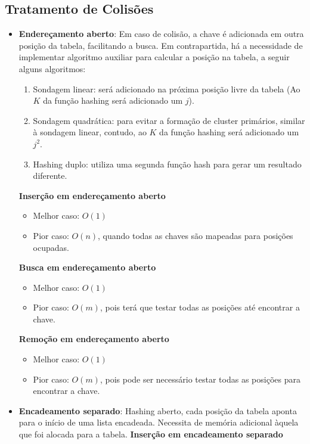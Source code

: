 \documentclass[•]{article}
\begin{document}
		\subsection{Tratamento de Colisões}
			\begin{itemize}
%			
%
				\item \textbf{Endereçamento aberto}: Em caso de colisão, a chave é adicionada em outra posição da tabela, facilitando a busca. Em contrapartida, há a necessidade de implementar algoritmo auxiliar para calcular a posição na tabela, a seguir alguns algoritmos:
				\begin{enumerate}
					\item Sondagem linear: será adicionado na próxima posição livre da tabela (Ao $K$ da função hashing será adicionado um $j$).
					\item Sondagem quadrática: para evitar a formação de cluster primários, similar à sondagem linear, contudo, ao $K$ da função hashing será adicionado um $j^2$.
					\item Hashing duplo: utiliza uma segunda função hash para gerar um resultado diferente. 
				\end{enumerate}\newpage
				\textbf{Inserção em endereçamento aberto}
				\begin{itemize}
					\item Melhor caso: $O(1)$
					\item Pior caso: $O(n)$, quando todas as chaves são mapeadas para posições ocupadas.
				\end{itemize}
				\textbf{Busca em endereçamento aberto}
				\begin{itemize}
					\item Melhor caso: $O(1)$
					\item Pior caso: $O(m)$, pois terá que testar todas as posições até encontrar a chave.
				\end{itemize}
				\textbf{Remoção em endereçamento aberto}
				\begin{itemize}
					\item Melhor caso: $O(1)$
					\item Pior caso: $O(m)$, pois pode ser necessário testar todas as posições para encontrar a chave.
				\end{itemize}
%				
%
				\item \textbf{Encadeamento separado}: Hashing aberto, cada posição da tabela aponta para o início de uma lista encadeada. Necessita de memória adicional àquela que foi alocada para a tabela.
				\textbf{Inserção em encadeamento separado}

\end{itemize}
\end{document}
